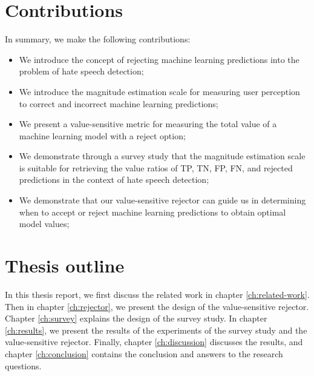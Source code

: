 \section{Contributions}
In summary, we make the following contributions:
%
\begin{itemize}
	\item We introduce the concept of rejecting machine learning predictions into the problem of hate speech detection;
	\item We introduce the magnitude estimation scale for measuring user perception to correct and incorrect machine learning predictions;
	\item We present a value-sensitive metric for measuring the total value of a machine learning model with a reject option;
	\item We demonstrate through a survey study that the magnitude estimation scale is suitable for retrieving the value ratios of TP, TN, FP, FN, and rejected predictions in the context of hate speech detection;
	\item We demonstrate that our value-sensitive rejector can guide us in determining when to accept or reject machine learning predictions to obtain optimal model values;
\end{itemize}

\section{Thesis outline}
%
In this thesis report, we first discuss the related work in chapter \ref{ch:related-work}.
%
Then in chapter \ref{ch:rejector}, we present the design of the value-sensitive rejector.
%
Chapter \ref{ch:survey} explains the design of the survey study.
%
In chapter \ref{ch:results}, we present the results of the experiments of the survey study and the value-sensitive rejector.
%
Finally, chapter \ref{ch:discussion} discusses the results, and chapter \ref{ch:conclusion} contains the conclusion and answers to the research questions.
